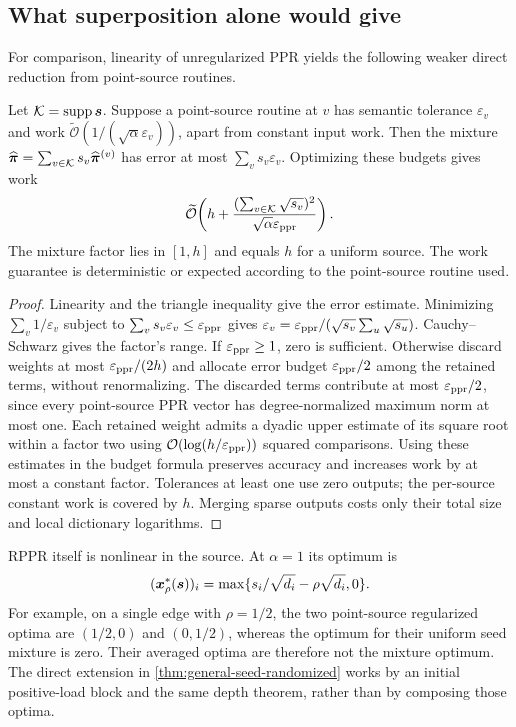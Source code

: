\subsection{What superposition alone would give}

For comparison, linearity of unregularized PPR yields the following
weaker direct reduction from point-source routines.

\begin{proposition}
\label{prop:sparse-source-superposition}
Let $\mathcal{K}=\operatorname{supp}\bm{s}$. Suppose a point-source routine at $v$ has
semantic tolerance $\varepsilon_v$ and work
$\widetilde{\mathcal{O}}(1/(\sqrt\alpha\varepsilon_v))$, apart from constant
input work. Then the mixture
$\widehat{\bm{\pi}}=\sum_{v\in\mathcal{K}}s_v\widehat{\bm{\pi}}^{(v)}$ has error at most
$\sum_vs_v\varepsilon_v$. Optimizing these budgets gives work
\begin{equation*}
 \widetilde{\mathcal{O}}\!\left(h+
       \frac{(\sum_{v\in\mathcal{K}}\sqrt{s_v})^2}
            {\sqrt\alpha\varepsilon_{\mathrm{ppr}}}\right).
\end{equation*}
The mixture factor lies in $[1,h]$ and equals $h$ for a uniform source.
The work guarantee is deterministic or expected according to the
point-source routine used.
\end{proposition}
\begin{proof}
Linearity and the triangle inequality give the error estimate.
Minimizing $\sum_v1/\varepsilon_v$ subject to
$\sum_vs_v\varepsilon_v\leq\varepsilon_{\mathrm{ppr}}$ gives
$\varepsilon_v=\varepsilon_{\mathrm{ppr}}/(\sqrt{s_v}\sum_u\sqrt{s_u})$.
Cauchy--Schwarz gives the factor's range. If $\varepsilon_{\mathrm{ppr}}\geq1$, zero is
sufficient. Otherwise discard weights at most $\varepsilon_{\mathrm{ppr}}/(2h)$ and allocate
error budget $\varepsilon_{\mathrm{ppr}}/2$ among the retained terms, without renormalizing.
The discarded terms contribute at most $\varepsilon_{\mathrm{ppr}}/2$, since every point-source
PPR vector has degree-normalized maximum norm at most one. Each retained
weight admits a dyadic upper estimate of its square root within a factor
two using $\mathcal{O}(\log(h/\varepsilon_{\mathrm{ppr}}))$ squared comparisons. Using these estimates
in the budget formula preserves accuracy and increases work by at most a
constant factor. Tolerances at least one use zero outputs; the per-source
constant work is covered by $h$. Merging sparse outputs costs only their
total size and local dictionary logarithms.
\end{proof}

RPPR itself is nonlinear in the source. At $\alpha=1$ its optimum is
\[
 (\bm{x}_\rho^*(\bm{s}))_i
   =\max\{s_i/\sqrt{d_i}-\rho\sqrt{d_i},0\}.
\]
For example, on a single edge with $\rho=1/2$, the two point-source
regularized optima are $(1/2,0)$ and $(0,1/2)$, whereas the optimum for
their uniform seed mixture is zero. Their averaged optima are therefore
not the mixture optimum. The direct extension in
\cref{thm:general-seed-randomized} works by an initial positive-load
block and the same depth theorem, rather than by composing those optima.

